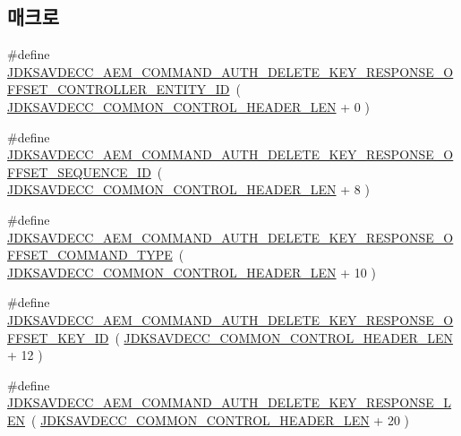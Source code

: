 \subsection*{매크로}
\begin{DoxyCompactItemize}
\item 
\#define \hyperlink{group__command__auth__delete__key__response_gaa3bc03b65a304de6150efe283b643947}{J\+D\+K\+S\+A\+V\+D\+E\+C\+C\+\_\+\+A\+E\+M\+\_\+\+C\+O\+M\+M\+A\+N\+D\+\_\+\+A\+U\+T\+H\+\_\+\+D\+E\+L\+E\+T\+E\+\_\+\+K\+E\+Y\+\_\+\+R\+E\+S\+P\+O\+N\+S\+E\+\_\+\+O\+F\+F\+S\+E\+T\+\_\+\+C\+O\+N\+T\+R\+O\+L\+L\+E\+R\+\_\+\+E\+N\+T\+I\+T\+Y\+\_\+\+ID}~( \hyperlink{group__jdksavdecc__avtp__common__control__header_gaae84052886fb1bb42f3bc5f85b741dff}{J\+D\+K\+S\+A\+V\+D\+E\+C\+C\+\_\+\+C\+O\+M\+M\+O\+N\+\_\+\+C\+O\+N\+T\+R\+O\+L\+\_\+\+H\+E\+A\+D\+E\+R\+\_\+\+L\+EN} + 0 )
\item 
\#define \hyperlink{group__command__auth__delete__key__response_gaa6578c46762f097f9e3333cc09d71dd0}{J\+D\+K\+S\+A\+V\+D\+E\+C\+C\+\_\+\+A\+E\+M\+\_\+\+C\+O\+M\+M\+A\+N\+D\+\_\+\+A\+U\+T\+H\+\_\+\+D\+E\+L\+E\+T\+E\+\_\+\+K\+E\+Y\+\_\+\+R\+E\+S\+P\+O\+N\+S\+E\+\_\+\+O\+F\+F\+S\+E\+T\+\_\+\+S\+E\+Q\+U\+E\+N\+C\+E\+\_\+\+ID}~( \hyperlink{group__jdksavdecc__avtp__common__control__header_gaae84052886fb1bb42f3bc5f85b741dff}{J\+D\+K\+S\+A\+V\+D\+E\+C\+C\+\_\+\+C\+O\+M\+M\+O\+N\+\_\+\+C\+O\+N\+T\+R\+O\+L\+\_\+\+H\+E\+A\+D\+E\+R\+\_\+\+L\+EN} + 8 )
\item 
\#define \hyperlink{group__command__auth__delete__key__response_gae92e7025c7b7d6edb84f9fced4dcca9f}{J\+D\+K\+S\+A\+V\+D\+E\+C\+C\+\_\+\+A\+E\+M\+\_\+\+C\+O\+M\+M\+A\+N\+D\+\_\+\+A\+U\+T\+H\+\_\+\+D\+E\+L\+E\+T\+E\+\_\+\+K\+E\+Y\+\_\+\+R\+E\+S\+P\+O\+N\+S\+E\+\_\+\+O\+F\+F\+S\+E\+T\+\_\+\+C\+O\+M\+M\+A\+N\+D\+\_\+\+T\+Y\+PE}~( \hyperlink{group__jdksavdecc__avtp__common__control__header_gaae84052886fb1bb42f3bc5f85b741dff}{J\+D\+K\+S\+A\+V\+D\+E\+C\+C\+\_\+\+C\+O\+M\+M\+O\+N\+\_\+\+C\+O\+N\+T\+R\+O\+L\+\_\+\+H\+E\+A\+D\+E\+R\+\_\+\+L\+EN} + 10 )
\item 
\#define \hyperlink{group__command__auth__delete__key__response_ga32cbe12a687dd568b3be98897d952c2b}{J\+D\+K\+S\+A\+V\+D\+E\+C\+C\+\_\+\+A\+E\+M\+\_\+\+C\+O\+M\+M\+A\+N\+D\+\_\+\+A\+U\+T\+H\+\_\+\+D\+E\+L\+E\+T\+E\+\_\+\+K\+E\+Y\+\_\+\+R\+E\+S\+P\+O\+N\+S\+E\+\_\+\+O\+F\+F\+S\+E\+T\+\_\+\+K\+E\+Y\+\_\+\+ID}~( \hyperlink{group__jdksavdecc__avtp__common__control__header_gaae84052886fb1bb42f3bc5f85b741dff}{J\+D\+K\+S\+A\+V\+D\+E\+C\+C\+\_\+\+C\+O\+M\+M\+O\+N\+\_\+\+C\+O\+N\+T\+R\+O\+L\+\_\+\+H\+E\+A\+D\+E\+R\+\_\+\+L\+EN} + 12 )
\item 
\#define \hyperlink{group__command__auth__delete__key__response_gad8fec5b20fa47316ff1050b21a4574e7}{J\+D\+K\+S\+A\+V\+D\+E\+C\+C\+\_\+\+A\+E\+M\+\_\+\+C\+O\+M\+M\+A\+N\+D\+\_\+\+A\+U\+T\+H\+\_\+\+D\+E\+L\+E\+T\+E\+\_\+\+K\+E\+Y\+\_\+\+R\+E\+S\+P\+O\+N\+S\+E\+\_\+\+L\+EN}~( \hyperlink{group__jdksavdecc__avtp__common__control__header_gaae84052886fb1bb42f3bc5f85b741dff}{J\+D\+K\+S\+A\+V\+D\+E\+C\+C\+\_\+\+C\+O\+M\+M\+O\+N\+\_\+\+C\+O\+N\+T\+R\+O\+L\+\_\+\+H\+E\+A\+D\+E\+R\+\_\+\+L\+EN} + 20 )
\end{DoxyCompactItemize}
